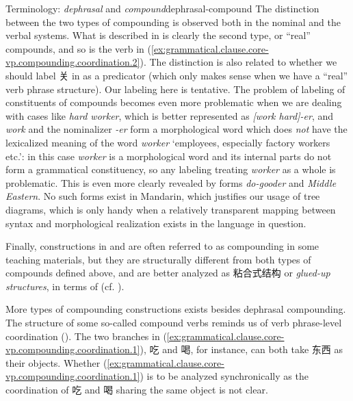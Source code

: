 \documentclass[UTF8, a4paper, oneside, scheme=plain, 12pt]{ctexrep}
\newcommand*{\term}[1]{\emph{#1}}
\newcommand{\form}[1]{\emph{#1}}
\newcommand{\translate}[1]{`#1'}
\begin{document}
\begin{theorybox}{Terminology: \term{dephrasal} and \term{compound}}{dephrasal-compound}
    The distinction between the two types of compounding is observed both in the nominal and the verbal systems.
    What is described in  is clearly the second type, or ``real'' compounds,
    and so is the verb in (\ref{ex:grammatical.clause.core-vp.compounding.coordination.2}).
    The distinction is also related to whether we should label 关 in  as a predicator (which only makes sense when we have a ``real'' verb phrase structure).
    Our labeling here is tentative. 
    The problem of labeling of constituents of compounds becomes even more problematic 
    when we are dealing with cases like \form{hard worker},
    which is better represented as \form{[work hard]-er},
    and \form{work} and the nominalizer \form{-er} form a morphological word
    which does \emph{not} have the lexicalized meaning of the word \form{worker}
    \translate{employees, especially factory workers etc.}:
    in this case \form{worker} is a morphological word
    and its internal parts do not form a grammatical constituency,
    so any labeling treating \form{worker} as a whole is problematic.
    This is even more clearly revealed by forms \form{do-gooder} and \form{Middle Eastern}.
    No such forms exist in Mandarin,
    which justifies our usage of tree diagrams,
    which is only handy when a relatively transparent mapping between syntax 
    and morphological realization exists in the language in question. 
    
    Finally, constructions in  and  are often referred to as compounding in some teaching materials,
    but they are structurally different from both types of compounds defined above,
    and are better analyzed as 粘合式结构 or \term{glued-up structures},
    in terms of \citet{zhudexigrammar} (cf. ).
\end{theorybox}

More types of compounding constructions exists besides dephrasal compounding.
The structure of some so-called compound verbs reminds us of verb phrase-level coordination ().
The two branches in (\ref{ex:grammatical.clause.core-vp.compounding.coordination.1}), 吃 and 喝,
for instance, can both take 东西 as their objects.
Whether (\ref{ex:grammatical.clause.core-vp.compounding.coordination.1})
is to be analyzed synchronically as the coordination of 吃 and 喝 sharing the same object is not clear.
\end{document}
